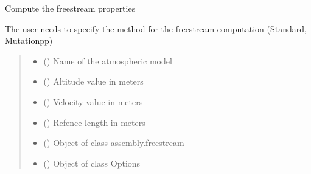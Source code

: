 \documentclass[letterpaper,10pt,english]{sphinxmanual}
\begin{document}
\begin{fulllineitems}
\label{\detokenize{modules:mix_properties.compute_freestream}}
\pysigstartsignatures
{}
\pysigstopsignatures
\sphinxAtStartPar
Compute the freestream properties

\sphinxAtStartPar
The user needs to specify the method for the freestream computation (Standard, Mutationpp)
\begin{quote}\begin{description}
\begin{itemize}
\item {} 
\sphinxAtStartPar
{} () \textendash{} Name of the atmospheric model

\item {} 
\sphinxAtStartPar
{} () \textendash{} Altitude value in meters

\item {} 
\sphinxAtStartPar
{} () \textendash{} Velocity value in meters

\item {} 
\sphinxAtStartPar
{} () \textendash{} Refence length in meters

\item {} 
\sphinxAtStartPar
{} ({\hyperref[\detokenize{modules:configuration.Freestream}]{}}) \textendash{} Object of class assembly.freestream

\item {} 
\sphinxAtStartPar
{} ({\hyperref[\detokenize{modules:configuration.Options}]{}}) \textendash{} Object of class Options

\end{itemize}

\end{description}\end{quote}

\end{fulllineitems}
\end{document}
